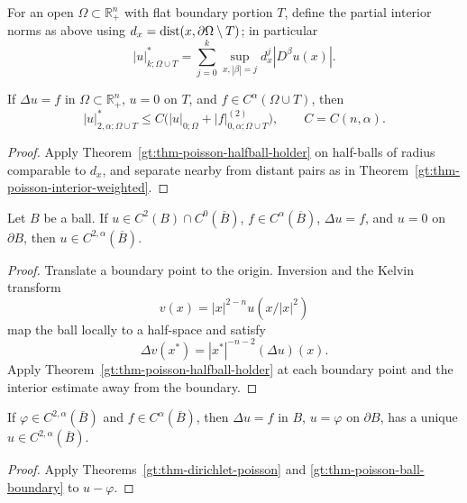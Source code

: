For an open $\Omega\subset\mathbb R^n_+$ with flat boundary portion $T$,
define the partial interior norms as above using
$d_x=\operatorname{dist}(x,\partial\Omega\setminus T)$; in particular
\begin{equation}
\tag{4.29}
|u|^*_{k;\Omega\cup T}=\sum_{j=0}^k
\sup_{x,|\beta|=j}d_x^j|D^\beta u(x)|.
\end{equation}

\begin{theorem}\label{gt:thm-poisson-partial-boundary}
If $\Delta u=f$ in $\Omega\subset\mathbb R^n_+$, $u=0$ on $T$, and
$f\in C^\alpha(\Omega\cup T)$, then
\begin{equation}
\tag{4.30}
|u|^*_{2,\alpha;\Omega\cup T}
\leq C\bigl(|u|_{0;\Omega}+|f|^{(2)}_{0,\alpha;\Omega\cup T}\bigr),
\qquad C=C(n,\alpha).
\end{equation}
\end{theorem}
\begin{proof}
\sketch Apply Theorem~\ref{gt:thm-poisson-halfball-holder} on half-balls of
radius comparable to $d_x$, and separate nearby from distant pairs as in
Theorem~\ref{gt:thm-poisson-interior-weighted}.
\end{proof}

\begin{theorem}\label{gt:thm-poisson-ball-boundary}
Let $B$ be a ball. If
$u\in C^2(B)\cap C^0(\overline B)$, $f\in C^\alpha(\overline B)$,
$\Delta u=f$, and $u=0$ on $\partial B$, then
$u\in C^{2,\alpha}(\overline B)$.
\end{theorem}
\begin{proof}
\sketch Translate a boundary point to the origin. Inversion and the Kelvin
transform
\begin{equation}
\tag{4.31}
v(x)=|x|^{2-n}u(x/|x|^2)
\end{equation}
map the ball locally to a half-space and satisfy
\begin{equation}
\tag{4.32}
\Delta v(x^*)=|x^*|^{-n-2}(\Delta u)(x).
\end{equation}
Apply Theorem~\ref{gt:thm-poisson-halfball-holder} at each boundary point
and the interior estimate away from the boundary.
\end{proof}

\begin{corollary}\label{gt:cor-poisson-ball-dirichlet}
If $\varphi\in C^{2,\alpha}(\overline B)$ and
$f\in C^\alpha(\overline B)$, then $\Delta u=f$ in $B$,
$u=\varphi$ on $\partial B$, has a unique
$u\in C^{2,\alpha}(\overline B)$.
\end{corollary}
\begin{proof}
\sketch Apply Theorems~\ref{gt:thm-dirichlet-poisson} and
\ref{gt:thm-poisson-ball-boundary} to $u-\varphi$.
\end{proof}

